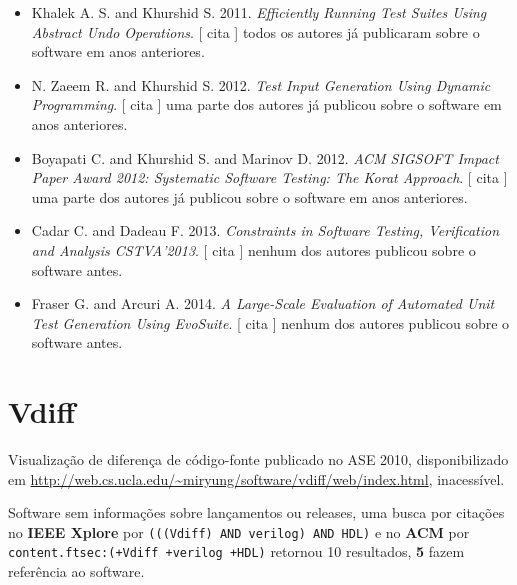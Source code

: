 \begin{itemize}
      [
          cita
      ]
uma parte dos autores já publicou sobre o software em anos anteriores.
\item Khalek A. S. and Khurshid S.
      2011.
        \textit{ Efficiently Running Test Suites Using Abstract Undo Operations}.
      [
          cita
      ]
todos os autores já publicaram sobre o software em anos anteriores.
\item N. Zaeem R. and Khurshid S.
      2012.
        \textit{ Test Input Generation Using Dynamic Programming}.
      [
          cita
      ]
uma parte dos autores já publicou sobre o software em anos anteriores.
\item Boyapati C. and Khurshid S. and Marinov D.
      2012.
        \textit{ ACM SIGSOFT Impact Paper Award 2012: Systematic Software Testing: The Korat Approach}.
      [
          cita
      ]
uma parte dos autores já publicou sobre o software em anos anteriores.
\item Cadar C. and Dadeau F.
      2013.
        \textit{ Constraints in Software Testing, Verification and Analysis CSTVA'2013}.
      [
          cita
      ]
nenhum dos autores publicou sobre o software antes.
\item Fraser G. and Arcuri A.
      2014.
        \textit{ A Large-Scale Evaluation of Automated Unit Test Generation Using EvoSuite}.
      [
          cita
      ]
nenhum dos autores publicou sobre o software antes.
\end{itemize}
\section{Vdiff}

Visualização de diferença de código-fonte
publicado no ASE 2010,
disponibilizado em \url{http://web.cs.ucla.edu/~miryung/software/vdiff/web/index.html},
inacessível.

Software sem informações sobre lançamentos ou releases,
uma busca por citações no {\bf IEEE Xplore} por
\texttt{(((Vdiff) AND verilog) AND HDL)}
e no {\bf ACM} por
\texttt{content.ftsec:(+Vdiff +verilog +HDL)}
retornou
10 resultados,
{\bf 5} fazem referência ao software.


